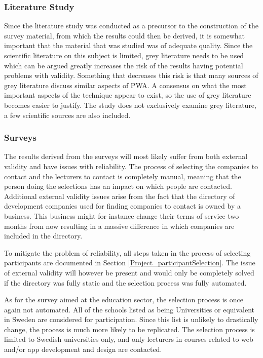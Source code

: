 \documentclass[a4paper,12pt]{article}
\begin{document}
\subsubsection{Literature Study}
\label{Method_reliabilityValidity_study}
Since the literature study was conducted as a precursor to the construction of the survey material, from which the results could then be derived, it is somewhat important that the material that was studied was of adequate quality. Since the scientific literature on this subject is limited, grey literature needs to be used which can be argued greatly increases the risk of the results having potential problems with validity. Something that decreases this risk is that many sources of grey literature discuss similar aspects of PWA. A consensus on what the most important aspects of the technique appear to exist, so the use of grey literature becomes easier to justify. The study does not exclusively examine grey literature, a few scientific sources are also included.

\subsubsection{Surveys}
\label{Method_reliabilityValidity_surveys}
The results derived from the surveys will most likely suffer from both external validity and have issues with reliability. The process of selecting the companies to contact and the lecturers to contact is completely manual, meaning that the person doing the selections has an impact on which people are contacted. Additional external validity issues arise from the fact that the directory of development companies used for finding companies to contact is owned by a business. This business might for instance change their terms of service two months from now resulting in a massive difference in which companies are included in the directory.

To mitigate the problem of reliability, all steps taken in the process of selecting participants are documented in Section \ref{Project_participantSelection}. The issue of external validity will however be present and would only be completely solved if the directory was fully static and the selection process was fully automated.

As for the survey aimed at the education sector, the selection process is once again not automated. All of the schools listed as being Universities or equivalent in Sweden are considered for participation. Since this list is unlikely to drastically change, the process is much more likely to be replicated. The selection process is limited to Swedish universities only, and only lecturers in courses related to web and/or app development and design are contacted.
\end{document}
